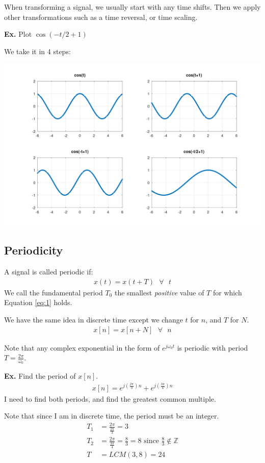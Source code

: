 \documentclass[12pt,letterpaper]{article} \usepackage{amsmath} \usepackage{graphicx} \usepackage[margin=1in]{geometry} \usepackage{longtable}  \usepackage{amssymb}
\begin{document}
	When transforming a signal, we usually start with any time shifts. Then we apply other transformations such as a time reversal, or time scaling. 
	
	\begin{mdframed}
		\textbf{Ex. } Plot $\cos(-t/2 + 1)$
		
		We take it in 4 steps:
		
		\centering
		\includegraphics[width=0.8\linewidth]{images/ex1}
	\end{mdframed}
	
	\subsection{Periodicity}
	A signal is called periodic if:
	\begin{align}
		x(t) = x(t+T) \text{  } \forall \text{ }t\label{eq:1}
	\end{align}
	We call the fundamental period $T_0$ the smallest \textit{positive} value of $T$ for which Equation \ref{eq:1} holds.
	
	We have the same idea in discrete time except we change $t$ for $n$, and $T$ for $N$.
	\begin{align}
		x[n] = x[n+N] \text{  } \forall \text{ }n\label{eq:2}
	\end{align}
	
	Note that any complex exponential in the form of $e^{j\omega_0 t}$ is periodic with period $T = \frac{2\pi}{\omega_0}$.
	
	\begin{mdframed}
		\textbf{Ex.} Find the period of $x[n]$.
		\begin{align*}
			x[n] = e^{j(\frac{2\pi}{3})n} + e^{j(\frac{3\pi}{4})n}
		\end{align*}
		I need to find both periods, and find the greatest common multiple. 
		
		Note that since I am in discrete time, the period must be an integer. 
		\begin{align*}
			T_1 &= \frac{2\pi}{\frac{2\pi}{3}} = 3\\
			T_2 &= \frac{2\pi}{\frac{3\pi}{4}} = \frac{8}{3} = 8 \text{ since } \frac{8}{3} \notin \mathbb {Z}\\
			T &= LCM(3,8) = 24
		\end{align*}
	\end{mdframed}
	
\end{document}
